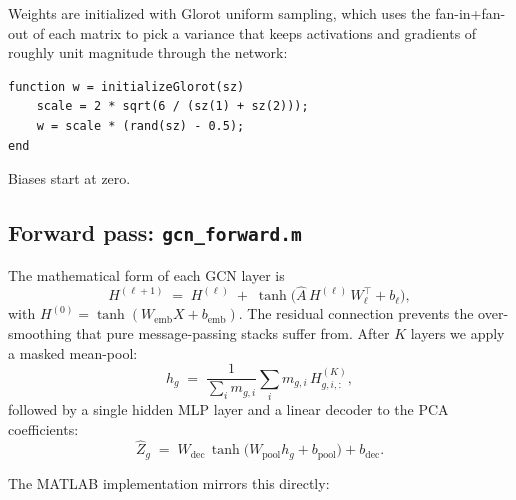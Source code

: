 \documentclass[11pt]{article}
\begin{document}
Weights are initialized with Glorot uniform sampling, which uses the
fan-in+fan-out of each matrix to pick a variance that keeps activations and
gradients of roughly unit magnitude through the network:

\begin{lstlisting}[caption={\texttt{helpers/initializeGlorot.m}}]
function w = initializeGlorot(sz)
    scale = 2 * sqrt(6 / (sz(1) + sz(2)));
    w = scale * (rand(sz) - 0.5);
end
\end{lstlisting}

Biases start at zero.

\subsection{Forward pass: \texttt{gcn\_forward.m}}

The mathematical form of each GCN layer is
\[
  H^{(\ell+1)} \;=\; H^{(\ell)} \;+\; \tanh\!\bigl(\hat A \, H^{(\ell)}\, W_\ell^{\!\top} + b_\ell\bigr),
\]
with $H^{(0)} = \tanh(W_{\mathrm{emb}}X + b_{\mathrm{emb}})$. The residual
connection prevents the over-smoothing that pure message-passing stacks
suffer from. After $K$ layers we apply a masked mean-pool:
\[
  h_g \;=\; \frac{1}{\sum_i m_{g,i}}\sum_i m_{g,i}\, H^{(K)}_{g,i,:},
\]
followed by a single hidden MLP layer and a linear decoder to the PCA
coefficients:
\[
  \widehat Z_g \;=\; W_{\mathrm{dec}} \, \tanh\!\bigl(W_{\mathrm{pool}} h_g + b_{\mathrm{pool}}\bigr) + b_{\mathrm{dec}}.
\]

The MATLAB implementation mirrors this directly:
\end{document}
